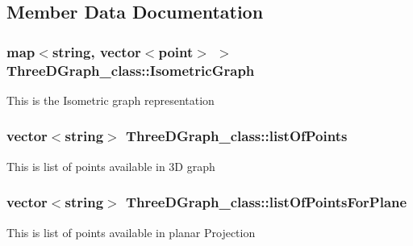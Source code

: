 \subsection{Member Data Documentation}
\subsubsection[{\texorpdfstring{Isometric\+Graph}{IsometricGraph}}]{\setlength{\rightskip}{0pt plus 5cm}map$<$string, vector$<${\bf point}$>$ $>$ Three\+D\+Graph\+\_\+class\+::\+Isometric\+Graph}\hypertarget{classThreeDGraph__class_afa3f00ec2a3864317ad121d087c9896d}{}\label{classThreeDGraph__class_afa3f00ec2a3864317ad121d087c9896d}
This is the Isometric graph representation 
\subsubsection[{\texorpdfstring{list\+Of\+Points}{listOfPoints}}]{\setlength{\rightskip}{0pt plus 5cm}vector$<$string$>$ Three\+D\+Graph\+\_\+class\+::list\+Of\+Points}\hypertarget{classThreeDGraph__class_ab24656328d4be1eae0f6f5742add5969}{}\label{classThreeDGraph__class_ab24656328d4be1eae0f6f5742add5969}
This is list of points available in 3D graph 
\subsubsection[{\texorpdfstring{list\+Of\+Points\+For\+Plane}{listOfPointsForPlane}}]{\setlength{\rightskip}{0pt plus 5cm}vector$<$string$>$ Three\+D\+Graph\+\_\+class\+::list\+Of\+Points\+For\+Plane}\hypertarget{classThreeDGraph__class_a7a63687d665e48d41867a293d5d8bc16}{}\label{classThreeDGraph__class_a7a63687d665e48d41867a293d5d8bc16}
This is list of points available in planar Projection 
